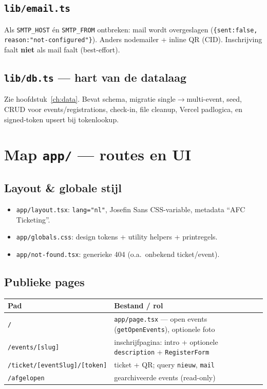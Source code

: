 \documentclass[11pt,a4paper]{report}
\begin{document}
\subsection{\texttt{lib/email.ts}}
Als \texttt{SMTP\_HOST} én \texttt{SMTP\_FROM} ontbreken: mail wordt overgeslagen
(\texttt{\{sent:false, reason:"not-configured"\}}). Anders nodemailer + inline QR (CID).
Inschrijving faalt \textbf{niet} als mail faalt (best-effort).

\subsection{\texttt{lib/db.ts} --- hart van de datalaag}
Zie hoofdstuk~\ref{ch:data}. Bevat schema, migratie single$\to$multi-event, seed,
CRUD voor events/registrations, check-in, file cleanup, Vercel padlogica, en
signed-token upsert bij tokenlookup.

\section{Map \texttt{app/} --- routes en UI}

\subsection{Layout \& globale stijl}
\begin{itemize}[leftmargin=*]
  \item \texttt{app/layout.tsx}: \texttt{lang="nl"}, Josefin Sans CSS-variable, metadata ``AFC Ticketing''.
  \item \texttt{app/globals.css}: design tokens + utility helpers + printregels.
  \item \texttt{app/not-found.tsx}: generieke 404 (o.a.\ onbekend ticket/event).
\end{itemize}

\subsection{Publieke pages}
\begin{tabularx}{\textwidth}{@{}lX@{}}
\toprule
\textbf{Pad} & \textbf{Bestand / rol} \\
\midrule
\texttt{/} & \texttt{app/page.tsx} --- open events (\texttt{getOpenEvents}), optionele foto \\
\texttt{/events/[slug]} & inschrijfpagina: intro + optionele \texttt{description} + \texttt{RegisterForm} \\
\texttt{/ticket/[eventSlug]/[token]} & ticket + QR; query \texttt{nieuw}, \texttt{mail} \\
\texttt{/afgelopen} & gearchiveerde events (read-only) \\
\bottomrule
\end{tabularx}
\end{document}
